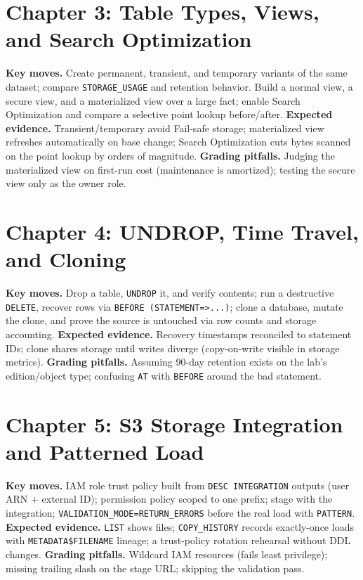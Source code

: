 \section{Chapter 3: Table Types, Views, and Search Optimization}
\textbf{Key moves.} Create permanent, transient, and temporary variants of the same dataset; compare \texttt{STORAGE\_USAGE} and retention behavior. Build a normal view, a secure view, and a materialized view over a large fact; enable Search Optimization and compare a selective point lookup before/after.
\textbf{Expected evidence.} Transient/temporary avoid Fail-safe storage; materialized view refreshes automatically on base change; Search Optimization cuts bytes scanned on the point lookup by orders of magnitude.
\textbf{Grading pitfalls.} Judging the materialized view on first-run cost (maintenance is amortized); testing the secure view only as the owner role.

\section{Chapter 4: UNDROP, Time Travel, and Cloning}
\textbf{Key moves.} Drop a table, \texttt{UNDROP} it, and verify contents; run a destructive \texttt{DELETE}, recover rows via \texttt{BEFORE (STATEMENT=>...)}; clone a database, mutate the clone, and prove the source is untouched via row counts and storage accounting.
\textbf{Expected evidence.} Recovery timestamps reconciled to statement IDs; clone shares storage until writes diverge (copy-on-write visible in storage metrics).
\textbf{Grading pitfalls.} Assuming 90-day retention exists on the lab's edition/object type; confusing \texttt{AT} with \texttt{BEFORE} around the bad statement.

\section{Chapter 5: S3 Storage Integration and Patterned Load}
\textbf{Key moves.} IAM role trust policy built from \texttt{DESC INTEGRATION} outputs (user ARN + external ID); permission policy scoped to one prefix; stage with the integration; \texttt{VALIDATION\_MODE=RETURN\_ERRORS} before the real load with \texttt{PATTERN}.
\textbf{Expected evidence.} \texttt{LIST} shows files; \texttt{COPY\_HISTORY} records exactly-once loads with \texttt{METADATA\$FILENAME} lineage; a trust-policy rotation rehearsal without DDL changes.
\textbf{Grading pitfalls.} Wildcard IAM resources (fails least privilege); missing trailing slash on the stage URL; skipping the validation pass.

